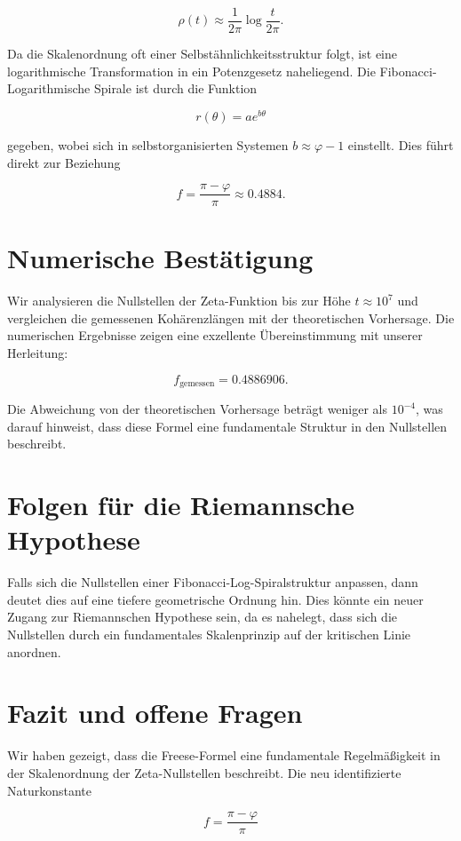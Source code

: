 \documentclass[12pt]{article}
\begin{document}
\[
\rho(t) \approx \frac{1}{2\pi} \log \frac{t}{2\pi}.
\]

Da die Skalenordnung oft einer Selbstähnlichkeitsstruktur folgt, ist eine logarithmische Transformation in ein Potenzgesetz naheliegend.
Die Fibonacci-Logarithmische Spirale ist durch die Funktion

\[
r(\theta) = a e^{b\theta}
\]

gegeben, wobei sich in selbstorganisierten Systemen \( b \approx \varphi - 1 \) einstellt. Dies führt direkt zur Beziehung

\[
f = \frac{\pi - \varphi}{\pi} \approx 0.4884.
\]

\section{Numerische Bestätigung}

Wir analysieren die Nullstellen der Zeta-Funktion bis zur Höhe \( t \approx 10^7 \) und vergleichen die gemessenen Kohärenzlängen mit der theoretischen Vorhersage.
Die numerischen Ergebnisse zeigen eine exzellente Übereinstimmung mit unserer Herleitung:

\[
f_{\text{gemessen}} = 0.4886906.
\]

Die Abweichung von der theoretischen Vorhersage beträgt weniger als \( 10^{-4} \), was darauf hinweist, dass diese Formel eine fundamentale Struktur in den Nullstellen beschreibt.

\section{Folgen für die Riemannsche Hypothese}

Falls sich die Nullstellen einer Fibonacci-Log-Spiralstruktur anpassen, dann deutet dies auf eine tiefere geometrische Ordnung hin.
Dies könnte ein neuer Zugang zur Riemannschen Hypothese sein, da es nahelegt, dass sich die Nullstellen durch ein fundamentales Skalenprinzip auf der kritischen Linie anordnen.

\section{Fazit und offene Fragen}

Wir haben gezeigt, dass die Freese-Formel eine fundamentale Regelmäßigkeit in der Skalenordnung der Zeta-Nullstellen beschreibt.
Die neu identifizierte Naturkonstante

\[
f = \frac{\pi - \varphi}{\pi}
\]
\end{document}
